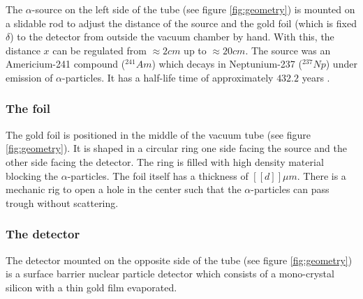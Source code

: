\documentclass[a4paper]{article}
\begin{document}
The $\alpha$-source on the left side of the tube (see figure \ref{fig:geometry}) is mounted on a slidable rod to adjust the distance of the source and the gold foil (which is fixed $\delta$) to the detector from outside the vacuum chamber by hand. With this, the distance $x$ can be regulated from $\approx 2cm$ up to $\approx 20cm$. The source was an Americium-241 compound ($^{241}Am$) which decays in Neptunium-237 ($^{237}Np$) under emission of $\alpha$-particles. It has a half-life time of approximately $432.2$ years \cite{audi2003}.

\subsubsection{The foil}

The gold foil is positioned in the middle of the vacuum tube (see figure \ref{fig:geometry}). It is shaped in a circular ring one side facing the source and the other side facing the detector. The ring is filled with high density material blocking the $\alpha$-particles. The foil itself has a thickness of $[[d]] \mu m$. There is a mechanic rig to open a hole in the center such that the $\alpha$-particles can pass trough without scattering.

\subsubsection{The detector}

The detector mounted on the opposite side of the tube (see figure \ref{fig:geometry}) is a surface barrier nuclear particle detector which consists of a mono-crystal silicon with a thin gold film evaporated.
\end{document}
